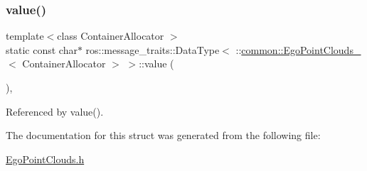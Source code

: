 \subsubsection{\texorpdfstring{value()}{value()}\hspace{0.1cm}{\footnotesize\ttfamily [2/2]}}
{\footnotesize\ttfamily template$<$class Container\+Allocator $>$ \\
static const char$\ast$ ros\+::message\+\_\+traits\+::\+Data\+Type$<$ \+::\hyperlink{structcommon_1_1EgoPointClouds__}{common\+::\+Ego\+Point\+Clouds\+\_\+}$<$ Container\+Allocator $>$ $>$\+::value (\begin{DoxyParamCaption}\item[{const \+::\hyperlink{structcommon_1_1EgoPointClouds__}{common\+::\+Ego\+Point\+Clouds\+\_\+}$<$ Container\+Allocator $>$ \&}]{ }\end{DoxyParamCaption})\hspace{0.3cm}{\ttfamily [inline]}, {\ttfamily [static]}}



Referenced by value().



The documentation for this struct was generated from the following file\+:\begin{DoxyCompactItemize}
\item 
\hyperlink{EgoPointClouds_8h}{Ego\+Point\+Clouds.\+h}\end{DoxyCompactItemize}
